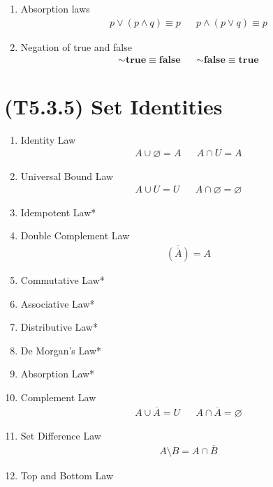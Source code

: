 \documentclass[landscape, a4paper]{article}
\newcommand{\Or}{\vee}
\newcommand{\true}{\textbf{true}}
\newcommand{\false}{\textbf{false}}
\renewcommand{\and}{\wedge}
\newcommand{\customsection}[1]{
    \vspace*{-16pt}
    \section*{#1}
    \vspace*{-4pt}
}
\newenvironment{wenumerate}{\begin{enumerate}[wide, labelindent=2pt]}{\end{enumerate}}
\begin{document}
\begin{multicols*}{4}
\begin{wenumerate}
\begin{align*}
            {\sim}(p \Or q)  & \equiv {\sim} p \and {\sim} q
        \end{align*}
        \item Absorption laws
        \begin{align*}
            p \Or (p \and q) \equiv p &  &
            p \and (p \Or q) \equiv p
        \end{align*}
        \item Negation of true and false
        \begin{align*}
            {\sim} \true \equiv \false &  & {\sim} \false \equiv \true
        \end{align*}
    \end{wenumerate}

    \customsection{(T5.3.5) Set Identities}
    \begin{wenumerate}
        \item Identity Law
        \begin{align*}
            A \cup \varnothing = A &  & A\cap U = A
        \end{align*}
        \item Universal Bound Law
        \begin{align*}
            A \cup U = U &  & A \cap \varnothing = \varnothing
        \end{align*}
        \item Idempotent Law*
        \item Double Complement Law
        \begin{align*}
            \overline{(\overline{A})}=A
        \end{align*}
        \item Commutative Law*
        \item Associative Law*
        \item Distributive Law*
        \item De Morgan's Law*
        \item Absorption Law*
        \item Complement Law
        \begin{align*}
            A\cup \overline{A}=U &  & A\cap \overline{A}=\varnothing
        \end{align*}
        \item Set Difference Law
        \begin{align*}
            A\setminus B=A\cap \overline{B}
        \end{align*}
        \item Top and Bottom Law

\end{wenumerate}
\end{multicols*}
\end{document}
